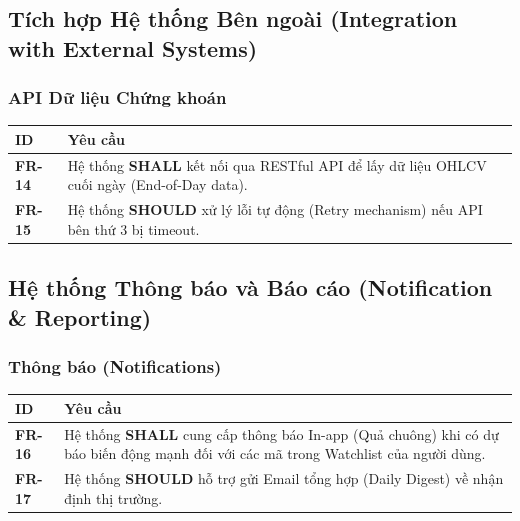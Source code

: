 \documentclass[12pt, a4paper]{article}
\begin{document}
\subsection{Tích hợp Hệ thống Bên ngoài (Integration with External Systems)}

\subsubsection{API Dữ liệu Chứng khoán}

\begin{table}[H]
    \centering
    \renewcommand{\arraystretch}{1.3}

    \begin{tabularx}{\textwidth}{|l|X|}
        \hline
        \rowcolor{gray!10}
        \textbf{ID}    & \textbf{Yêu cầu}                                                                                  \\
        \hline
        \textbf{FR-14} & Hệ thống \textbf{SHALL} kết nối qua RESTful API để lấy dữ liệu OHLCV cuối ngày (End-of-Day data). \\
        \hline
        \textbf{FR-15} & Hệ thống \textbf{SHOULD} xử lý lỗi tự động (Retry mechanism) nếu API bên thứ 3 bị timeout.        \\
        \hline
    \end{tabularx}

\end{table}

\subsection{Hệ thống Thông báo và Báo cáo (Notification \& Reporting)}

\subsubsection{Thông báo (Notifications)}

\begin{table}[H]
    \centering
    \renewcommand{\arraystretch}{1.3}

    \begin{tabularx}{\textwidth}{|l|X|}
        \hline
        \rowcolor{gray!10}
        \textbf{ID}    & \textbf{Yêu cầu}                                                                                                                           \\
        \hline
        \textbf{FR-16} & Hệ thống \textbf{SHALL} cung cấp thông báo In-app (Quả chuông) khi có dự báo biến động mạnh đối với các mã trong Watchlist của người dùng. \\
        \hline
        \textbf{FR-17} & Hệ thống \textbf{SHOULD} hỗ trợ gửi Email tổng hợp (Daily Digest) về nhận định thị trường.                                                 \\
        \hline
    \end{tabularx}

\end{table}
\end{document}
